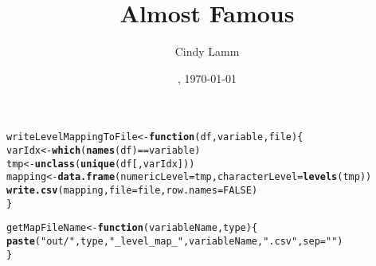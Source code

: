 \documentclass{article}\usepackage[]{graphicx}\usepackage[]{color}
\makeatletter
\newcommand{\hlnum}[1]{\textcolor[rgb]{0.686,0.059,0.569}{#1}}%
\newcommand{\hlstr}[1]{\textcolor[rgb]{0.192,0.494,0.8}{#1}}%
\newcommand{\hlopt}[1]{\textcolor[rgb]{0,0,0}{#1}}%
\newcommand{\hlstd}[1]{\textcolor[rgb]{0.345,0.345,0.345}{#1}}%
\newcommand{\hlkwa}[1]{\textcolor[rgb]{0.161,0.373,0.58}{\textbf{#1}}}%
\newcommand{\hlkwb}[1]{\textcolor[rgb]{0.69,0.353,0.396}{#1}}%
\newcommand{\hlkwc}[1]{\textcolor[rgb]{0.333,0.667,0.333}{#1}}%
\newcommand{\hlkwd}[1]{\textcolor[rgb]{0.737,0.353,0.396}{\textbf{#1}}}%
\newenvironment{kframe}{%
 \def\at@end@of@kframe{}%
 \ifinner\ifhmode%
  \def\at@end@of@kframe{\end{minipage}}%
  \begin{minipage}{\columnwidth}%
 \fi\fi%
 \def\FrameCommand##1{\hskip\@totalleftmargin \hskip-\fboxsep
 \colorbox{shadecolor}{##1}\hskip-\fboxsep
     \hskip-\linewidth \hskip-\@totalleftmargin \hskip\columnwidth}%
 \MakeFramed {\advance\hsize-\width
   \@totalleftmargin\z@ \linewidth\hsize
   \@setminipage}}%
 {\par\unskip\endMakeFramed%
 \at@end@of@kframe}
\newenvironment{knitrout}{}{} %
\makeatother
\begin{document}
\flushbottom



\date{\currenttime, \today}
\title{Almost Famous}
\author{Cindy Lamm}

\maketitle













\begin{knitrout}
\color{fgcolor}\begin{kframe}
\begin{alltt}
\hlstd{writeLevelMappingToFile} \hlkwb{<-} \hlkwa{function}\hlstd{(}\hlkwc{df}\hlstd{,} \hlkwc{variable}\hlstd{,} \hlkwc{file}\hlstd{) \{}
  \hlstd{varIdx} \hlkwb{<-} \hlkwd{which}\hlstd{(}\hlkwd{names}\hlstd{(df)}\hlopt{==}\hlstd{variable)}
  \hlstd{tmp} \hlkwb{<-} \hlkwd{unclass}\hlstd{(}\hlkwd{unique}\hlstd{(df[,varIdx]))}
  \hlstd{mapping} \hlkwb{<-} \hlkwd{data.frame}\hlstd{(}\hlkwc{numericLevel}\hlstd{=tmp,} \hlkwc{characterLevel}\hlstd{=}\hlkwd{levels}\hlstd{(tmp))}
  \hlkwd{write.csv}\hlstd{(mapping,} \hlkwc{file}\hlstd{=file,} \hlkwc{row.names}\hlstd{=}\hlnum{FALSE}\hlstd{)}
\hlstd{\}}
\end{alltt}
\end{kframe}
\end{knitrout}

\begin{knitrout}
\color{fgcolor}\begin{kframe}
\begin{alltt}
\hlstd{getMapFileName} \hlkwb{<-} \hlkwa{function}\hlstd{(}\hlkwc{variableName}\hlstd{,} \hlkwc{type}\hlstd{) \{}
  \hlkwd{paste}\hlstd{(}\hlstr{"out/"}\hlstd{,type,}\hlstr{"_level_map_"}\hlstd{,variableName,}\hlstr{".csv"}\hlstd{,} \hlkwc{sep}\hlstd{=}\hlstr{""}\hlstd{)}
\hlstd{\}}
\end{alltt}
\end{kframe}
\end{knitrout}

\end{document}
